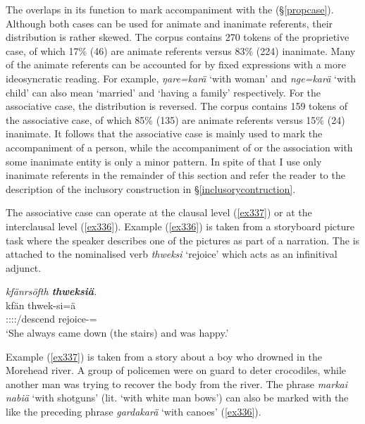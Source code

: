 The   overlaps in its function to mark accompaniment with the   ({\S}\ref{propcase}). Although both cases can be used for animate and inanimate referents, their distribution is rather skewed. The corpus contains 270 tokens of the proprietive case, of which 17\% (46) are animate referents versus 83\% (224) inanimate. Many of the animate referents can be accounted for by fixed expressions with a more ideosyncratic reading. For example, \emph{ŋare=karä} `with woman' and \emph{nge=karä} `with child' can also mean `married' and `having a family' respectively. For the associative case, the distribution is reversed. The corpus contains 159 tokens of the associative case, of which 85\% (135) are animate referents versus 15\% (24) inanimate. It follows that the associative case is mainly used to mark the accompaniment of a person, while the accompaniment of or the association with some inanimate entity is only a minor pattern. In spite of that I use only inanimate referents in the remainder of this section and refer the reader to the description of the inclusory construction in \S\ref{inclusorycontruction}. 

The associative case can operate at the clausal level (\ref{ex337}) or at the interclausal level (\ref{ex336}). Example (\ref{ex336}) is taken from a storyboard picture task where the speaker describes one of the pictures as part of a narration. The  is attached to the nominalised verb \emph{thweksi} `rejoice' which acts as an infinitival adjunct. 

\begin{exe}
	\ex \emph{kfänrsöfth \textbf{thweksiä}.}\\
	\gll kfän thwek-si=ä\\
	\Stsg:\Sbj:\Pst:\Iter:\Venit/descend rejoice-\Nmlz={\Assoc}\\
	\trans `She always came down (the stairs) and was happy.'
	\label{ex336}
\end{exe}

Example (\ref{ex337}) is taken from a story about a boy who drowned in the Morehead river. A group of policemen were on guard to deter crocodiles, while another man was trying to recover the body from the river. The phrase \emph{markai nabiä} `with shotguns' (lit. `with white man bows') can also be marked with the   like the preceding phrase \emph{gardakarä} `with canoes' (\ref{ex336}).


